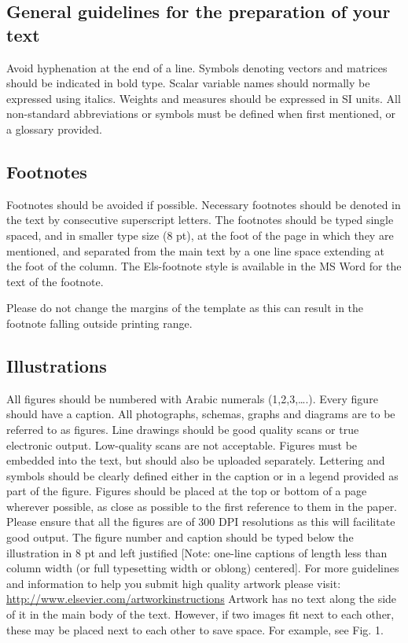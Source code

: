 \documentclass[10pt]{article}
\begin{document}
\subsection{General guidelines for the preparation of your text}
Avoid hyphenation at the end of a line. Symbols denoting vectors and matrices should be indicated in bold type. Scalar variable names should normally be expressed using italics. Weights and measures should be expressed in SI units. All non-standard abbreviations or symbols must be defined when first mentioned, or a glossary provided.


\subsection{Footnotes}
Footnotes should be avoided if possible. Necessary footnotes should be denoted in the text by consecutive superscript letters. The footnotes should be typed single spaced, and in smaller type size (8 pt), at the foot of the page in which they are mentioned, and separated from the main text by a one line space extending at the foot of the column. The Els-footnote style is available in the MS Word for the text of the footnote.

Please do not change the margins of the template as this can result in the footnote falling outside printing range.

\subsection{Illustrations}
All figures should be numbered with Arabic numerals (1,2,3,….). Every figure should have a caption. All photographs, schemas, graphs and diagrams are to be referred to as figures. Line drawings should be good quality scans or true electronic output. Low-quality scans are not acceptable. Figures must be embedded into the text, but should also be uploaded separately. Lettering and symbols should be clearly defined either in the caption or in a legend provided as part of the figure. Figures should be placed at the top or bottom of a page wherever possible, as close as possible to the first reference to them in the paper. Please ensure that all the figures are of 300 DPI resolutions as this will facilitate good output.
The figure number and caption should be typed below the illustration in 8 pt and left justified [Note: one-line captions of length less than column width (or full typesetting width or oblong) centered]. For more guidelines and information to help you submit high quality artwork please visit: \url{http://www.elsevier.com/artworkinstructions} Artwork has no text along the side of it in the main body of the text. However, if two images fit next to each other, these may be placed next to each other to save space. For example, see Fig. 1. 
\end{document}
